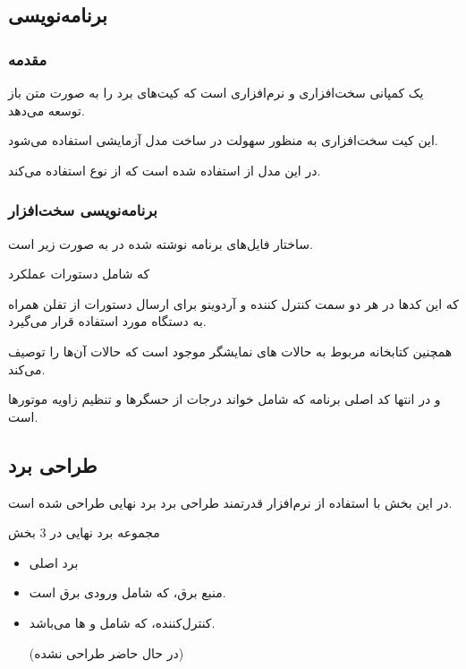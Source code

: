\documentclass[a4paper,12pt]{report}
\begin{document}
	\subsection{
	برنامه‌نویسی
	}\label{subsec1:sec3:chap2}
	\subsubsection{
	مقدمه}
	\label{subsubsec1:subsec1:sec3:chap2}
	یک کمپانی سخت‌افزاری و نرم‌افزاری است که کیت‌های برد
	را به صورت متن باز توسعه می‌دهد.

	این کیت سخت‌افزاری به منظور سهولت در ساخت مدل آزمایشی استفاده می‌شود.

	در این مدل از
	استفاده شده است که از
	نوع
	استفاده می‌کند.

	\subsubsection{
	برنامه‌نویسی سخت‌افزار
	}\label{subsubsec2:subsec1:sec3:chap2}
	ساختار فایل‌های برنامه نوشته شده در
	به صورت زیر است.

	که شامل دستورات عملکرد

	که این کدها در هر دو سمت کنترل کننده و آردوینو برای ارسال دستورات از تفلن همراه به دستگاه مورد استفاده قرار می‌گیرد.

	همچنین کتابخانه مربوط به حالات
	های نمایشگر موجود است که حالات آن‌ها را توصیف می‌کند.

	و در انتها  کد اصلی برنامه که شامل خواند درجات از حسگر‌ها و تنظیم زاویه موتورها است.
	\begin{latin}
	\end{latin}

	\subsection{
		طراحی برد
	}\label{subsec2:sec3:chap2}
		در این بخش با استفاده از نرم‌افزار قدرتمند طراحی برد
		برد نهایی طراحی شده است.

		مجموعه برد نهایی در
		$ 3 $
		بخش
		\begin{itemize}[nosep]
			\item
				برد اصلی
			\item
				منبع برق، ‌که شامل ورودی برق است.
			\item
				کنترل‌کننده، که شامل
				و
				ها می‌باشد.

				\danger
				(در حال حاضر طراحی نشده)
		\end{itemize}
\end{document}
